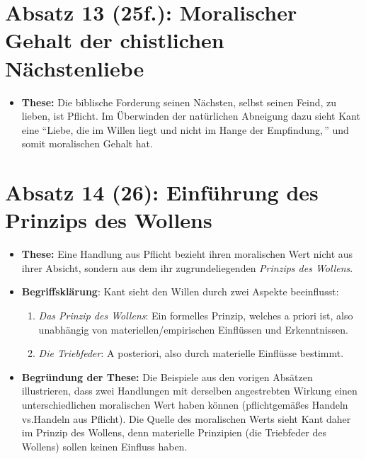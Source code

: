 \documentclass{llncs}
\begin{document}
\section*{Absatz 13 (25f.): Moralischer Gehalt der chistlichen Nächstenliebe}

\begin{itemize}
	\item \textbf{These:} Die biblische Forderung seinen Nächsten, selbst seinen Feind, zu lieben, ist Pflicht.
		Im Überwinden der natürlichen Abneigung dazu sieht Kant eine ``Liebe, die im Willen liegt und nicht im Hange der Empfindung,\,'' und somit moralischen Gehalt hat.
\end{itemize}

\section*{Absatz 14 (26): Einführung des Prinzips des Wollens}

\begin{itemize}
	\item \textbf{These:} Eine Handlung aus Pflicht bezieht ihren moralischen Wert nicht aus ihrer Absicht, sondern aus dem ihr zugrundeliegenden \textit{Prinzips des Wollens}.
	\item \textbf{Begriffsklärung}: Kant sieht den Willen durch zwei Aspekte beeinflusst:
		\begin{enumerate}
			\item \textit{Das Prinzip des Wollens}: Ein formelles Prinzip, welches a priori ist, also unabhängig von materiellen/empirischen Einflüssen und Erkenntnissen.
			\item \textit{Die Triebfeder}: A posteriori, also durch materielle Einflüsse bestimmt.
		\end{enumerate}
	\item \textbf{Begründung der These:} Die Beispiele aus den vorigen Absätzen illustrieren, dass zwei Handlungen mit derselben angestrebten Wirkung einen unterschiedlichen moralischen Wert haben können (pflichtgemäßes Handeln vs.\@ Handeln aus Pflicht).
		Die Quelle des moralischen Werts sieht Kant daher im Prinzip des Wollens, denn materielle Prinzipien (die Triebfeder des Wollens) sollen keinen Einfluss haben.
\end{itemize}
\end{document}
